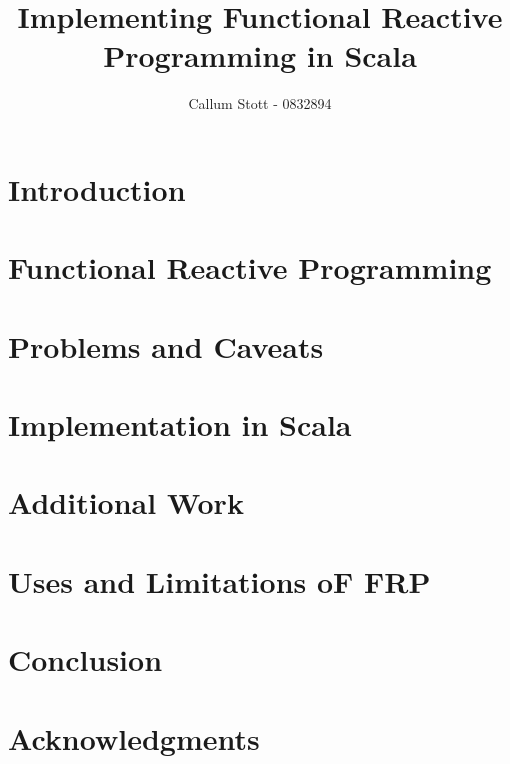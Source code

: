 \documentclass{article}
\begin{document}
  \title{Implementing Functional Reactive Programming in Scala}
  \author{Callum Stott - 0832894}
  \maketitle
  \newpage
  \twocolumn
  \section{Introduction}
  \section{Functional Reactive Programming}
  \section{Problems and Caveats}
  \section{Implementation in Scala}
  \section{Additional Work}
  \section{Uses and Limitations oF FRP}
  \section{Conclusion}
  \section{Acknowledgments}
\end{document}
